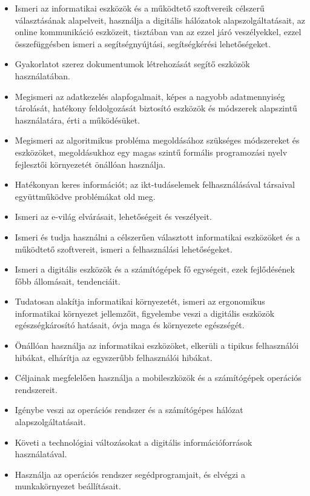 \begin{itemize}
\item
  Ismeri az informatikai eszközök és a működtető szoftvereik célszerű
  választásának alapelveit, használja a digitális hálózatok
  alapszolgáltatásait, az online kommunikáció eszközeit, tisztában van
  az ezzel járó veszélyekkel, ezzel összefüggésben ismeri a
  segítségnyújtási, segítségkérési lehetőségeket.
\item
  Gyakorlatot szerez dokumentumok létrehozását segítő eszközök
  használatában.
\item
  Megismeri az adatkezelés alapfogalmait, képes a nagyobb adatmennyiség
  tárolását, hatékony feldolgozását biztosító eszközök és módszerek
  alapszintű használatára, érti a működésüket.
\item
  Megismeri az algoritmikus probléma megoldásához szükséges módszereket
  és eszközöket, megoldásukhoz egy magas szintű formális programozási
  nyelv fejlesztői környezetét önállóan használja.
\item
  Hatékonyan keres információt; az ikt-tudáselemek felhasználásával
  társaival együttműködve problémákat old meg.
\item
  Ismeri az e-világ elvárásait, lehetőségeit és veszélyeit.
\item
  Ismeri és tudja használni a célszerűen választott informatikai
  eszközöket és a működtető szoftvereit, ismeri a felhasználási
  lehetőségeket.
\item
  Ismeri a digitális eszközök és a számítógépek fő egységeit, ezek
  fejlődésének főbb állomásait, tendenciáit.
\item
  Tudatosan alakítja informatikai környezetét, ismeri az ergonomikus
  informatikai környezet jellemzőit, figyelembe veszi a digitális
  eszközök egészségkárosító hatásait, óvja maga és környezete
  egészségét.
\item
  Önállóan használja az informatikai eszközöket, elkerüli a tipikus
  felhasználói hibákat, elhárítja az egyszerűbb felhasználói hibákat.
\item
  Céljainak megfelelően használja a mobileszközök és a számítógépek
  operációs rendszereit.
\item
  Igénybe veszi az operációs rendszer és a számítógépes hálózat
  alapszolgáltatásait.
\item
  Követi a technológiai változásokat a digitális információforrások
  használatával.
\item
  Használja az operációs rendszer segédprogramjait, és elvégzi a
  munkakörnyezet beállításait.

\end{itemize}

